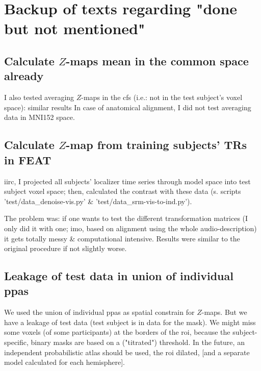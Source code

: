\pagebreak

\section{Backup of texts regarding "done but not mentioned"}


\subsection{Calculate $Z$-maps mean in the common space already}
%
I also tested averaging $Z$-maps in the \ac{cfs} (i.e.: not in the test
subject's voxel space): similar results
%
In case of anatomical alignment, I did
not test averaging data in MNI152 space.


\subsection{Calculate $Z$-map from training subjects' TRs in FEAT}

iirc, I projected all subjects' localizer time series through
model space into test subject voxel space; then, calculated the contrast
with these data (s. scripts 'test/data\_denoise-vis.py' \&
'test/data\_srm-vis-to-ind.py').
%

The problem was: if one wants to test the different transformation matrices (I
only did it with one; imo, based on alignment using the whole audio-description)
it gets totally messy \& computational intensive.
%
Results were similar to the original procedure if not slightly worse.


\subsection{Leakage of test data in union of individual \acp{ppa}}

%
We used the union of individual \acp{ppa} as spatial constrain for $Z$-maps.
%
But we have a leakage of test data (test subject is in data for the mask).
%
We might miss some voxels (of some participants) at the borders of the \ac{roi},
because the subject-specific, binary masks are based on a ("titrated")
threshold.  \citep{sengupta2016extension}
%
In the future, an independent probabilistic atlas should be used, the \ac{roi}
dilated, [and a separate model calculated for each hemisphere].
